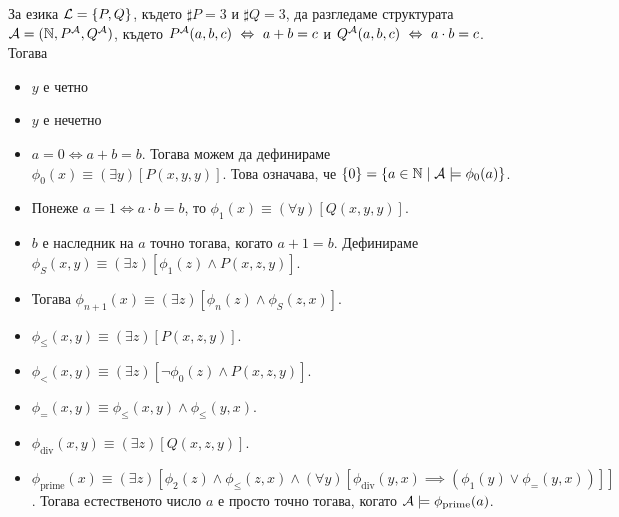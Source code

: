 \begin{example}
  За езика $\mathcal{L} = \{P,Q\}$, където $\sharp P = 3$ и $\sharp Q = 3$,
  да разгледаме структурата $\mathcal{A} = (\mathbb{N}, P^{\mathcal{A}},Q^{\mathcal{A}})$, където
  $P^{\mathcal{A}}(a,b,c) \ \Leftrightarrow\  a+b = c$ и $Q^{\mathcal{A}}(a,b,c) \ \Leftrightarrow\  a\cdot b = c$.
  Тогава
  \begin{itemize}
  \item
    $y$ е четно
  \item
    $y$ е нечетно
  \item
    $a = 0 \iff a+b = b$. 
    Тогава можем да дефинираме $\phi_0(x) \equiv (\exists y)[P(x,y,y)]$.
    Това означава, че $\{0\} = \{a \in \mathbb{N} \mid \mathcal{A} \models \phi_0(a)\}$.
  \item
    Понеже $a = 1 \iff a \cdot b = b$, то
    $\phi_1(x) \equiv (\forall y)[Q(x,y,y)]$.
  \item
    $b$ е наследник на $a$ точно тогава, когато $a+1 = b$.
    Дефинираме
    $\phi_{S}(x,y) \equiv (\exists z)[\phi_1(z) \land P(x,z,y)]$.
  \item
    Тогава
    $\phi_{n+1}(x) \equiv (\exists z)[\phi_n(z) \land \phi_{S}(z,x)]$.
  \item
    $\phi_{\leq}(x,y) \equiv (\exists z)[P(x,z,y)]$.
  \item
    $\phi_{<}(x,y) \equiv (\exists z)[\neg \phi_0(z) \land P(x,z,y)]$.
  \item
    $\phi_{=}(x,y) \equiv \phi_{\leq}(x,y) \land \phi_{\leq}(y,x)$.
  \item
    $\phi_{\text{div}}(x,y) \equiv (\exists z)[Q(x,z,y)]$.
  \item
    $\phi_{\text{prime}}(x) \equiv (\exists z)[\phi_2(z) \land \phi_{\leq}(z,x) \land (\forall y)[\phi_{\text{div}}(y,x) \implies (\phi_1(y) \lor
    \phi_{=}(y,x))]]$.
    Тогава естественото число $a$ е просто точно тогава, когато $\mathcal{A} \models \phi_{\text{prime}}(a)$.
  \end{itemize}
\end{example}


